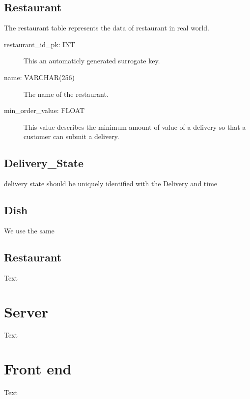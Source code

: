 \documentclass[parskip=half, a4paper, DIV=14]{scrartcl}
\begin{document}
	\subsection{Restaurant}
	The restaurant table represents the data of restaurant in real world.

	\begin{description}
		\item[restaurant\_id\_pk: INT] This an automaticly generated surrogate key.
		\item[name: VARCHAR(256)] The name of the restaurant.
		\item[min\_order\_value: FLOAT] This value describes the minimum amount of value of a delivery so that a customer can submit a delivery.
	\end{description}

	\subsection{Delivery\_State}
	delivery state should be uniquely identified with the Delivery and time

\subsection{Dish}
We use the same

\subsection{Restaurant}
Text

\section{Server}
Text
\section{Front end}
Text
\end{document}
